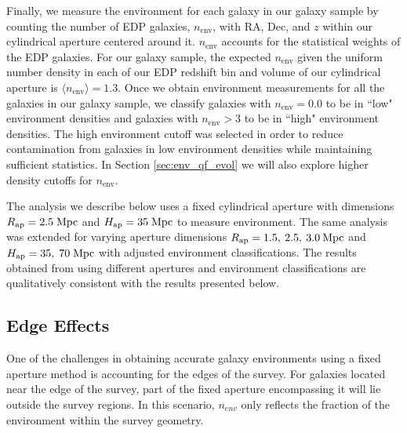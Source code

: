 Finally, we measure the environment for each galaxy in our galaxy
sample by counting the number of EDP galaxies, $n_{\mathrm{env}}$, with RA,
Dec, and $z$ within our cylindrical aperture centered around
it. $n_{\mathrm{env}}$ accounts for the statistical weights of the EDP
galaxies. 
For our galaxy sample, the expected $n_{\mathrm{env}}$ given the uniform number density in 
each of our EDP redshift bin and volume of our cylindrical aperture is $\langle n_{\mathrm{env}} \rangle = 1.3$. 
Once we obtain environment measurements for all the galaxies
in our galaxy sample, we classify galaxies with $n_{\mathrm{env}} = 0.0$
to be in ``low" environment densities and galaxies with $n_{\mathrm{env}} > 3$
to be in ``high" environment densities. The high environment cutoff was
selected in order to reduce contamination from galaxies in low
environment densities while maintaining sufficient statistics. In
Section \ref{sec:env_qf_evol} we will also explore higher density
cutoffs for $n_{\mathrm{env}}$.

The analysis we describe below uses a fixed cylindrical aperture with
dimensions $R_{\mathrm{ap}} = 2.5 \; \mathrm{Mpc}$ and $H_{\mathrm{ap}} = 35
\;\mathrm{Mpc}$ to measure environment. The same analysis was
extended for varying aperture dimensions $R_{\mathrm{ap}} = 1.5, \: 2.5, \:3.0 \:
\mathrm{Mpc}$ and $H_{\mathrm{ap}} = 35, \; 70 \;\mathrm{Mpc}$ with adjusted environment classifications. 
The results obtained from using different apertures and
environment classifications are qualitatively consistent with the results presented below.  

\subsection{Edge Effects} \label{sec:edgeeffect}
One of the challenges in obtaining accurate galaxy environments using a fixed aperture method is accounting for the edges of the survey. For galaxies located near the edge of the survey, part of the fixed aperture encompassing it will lie outside the survey regions. In this scenario, $n_{env}$ only reflects the fraction of the environment within the survey geometry.

